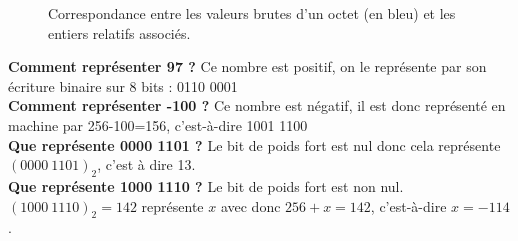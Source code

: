 \begin{figure}[H]
\begin{center}
\end{center}
\caption*{Correspondance entre les valeurs \og brutes \fg{} d'un octet (en bleu) et les entiers relatifs associés.}
\end{figure}
\begin{exemple}[s]
    \textbf{Comment représenter 97 ?} Ce nombre est positif, on le représente par son écriture binaire sur 8 bits : 0110
    0001\\

    \textbf{Comment représenter -100 ?} Ce nombre est négatif, il est donc représenté en machine par 256-100=156,
    c'est-à-dire 1001 1100\\

    \textbf{Que représente 0000 1101 ?} Le bit de poids fort est nul donc cela représente $(0000\ 1101)_2$, c'est à dire
    13.\\

    \textbf{Que représente 1000 1110 ?} Le bit de poids fort est non nul. $(1000\ 1110)_2=142$ représente $x$ avec donc
    $256+x=142$, c'est-à-dire $x=-114$.
\end{exemple}

